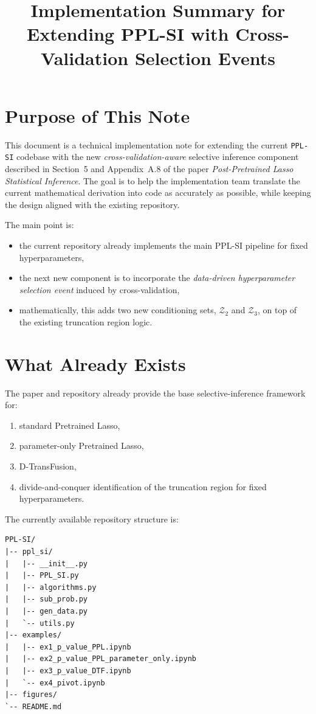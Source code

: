 \documentclass[11pt]{article}
\title{Implementation Summary for Extending PPL-SI with Cross-Validation Selection Events}
\author{}
\date{}
\begin{document}
\maketitle

\section{Purpose of This Note}
This document is a technical implementation note for extending the current \texttt{PPL-SI} codebase with the new \emph{cross-validation-aware} selective inference component described in Section~5 and Appendix~A.8 of the paper \emph{Post-Pretrained Lasso Statistical Inference}. The goal is to help the implementation team translate the current mathematical derivation into code as accurately as possible, while keeping the design aligned with the existing repository.

The main point is:
\begin{itemize}[leftmargin=2em]
    \item the current repository already implements the main PPL-SI pipeline for fixed hyperparameters,
    \item the next new component is to incorporate the \emph{data-driven hyperparameter selection event} induced by cross-validation,
    \item mathematically, this adds two new conditioning sets, $\mathcal{Z}_2$ and $\mathcal{Z}_3$, on top of the existing truncation region logic.
\end{itemize}

\section{What Already Exists}
The paper and repository already provide the base selective-inference framework for:
\begin{enumerate}[leftmargin=2em]
    \item standard Pretrained Lasso,
    \item parameter-only Pretrained Lasso,
    \item D-TransFusion,
    \item divide-and-conquer identification of the truncation region for fixed hyperparameters.
\end{enumerate}

The currently available repository structure is:
\begin{verbatim}
PPL-SI/
|-- ppl_si/
|   |-- __init__.py
|   |-- PPL_SI.py
|   |-- algorithms.py
|   |-- sub_prob.py
|   |-- gen_data.py
|   `-- utils.py
|-- examples/
|   |-- ex1_p_value_PPL.ipynb
|   |-- ex2_p_value_PPL_parameter_only.ipynb
|   |-- ex3_p_value_DTF.ipynb
|   `-- ex4_pivot.ipynb
|-- figures/
`-- README.md
\end{verbatim}
\end{document}
